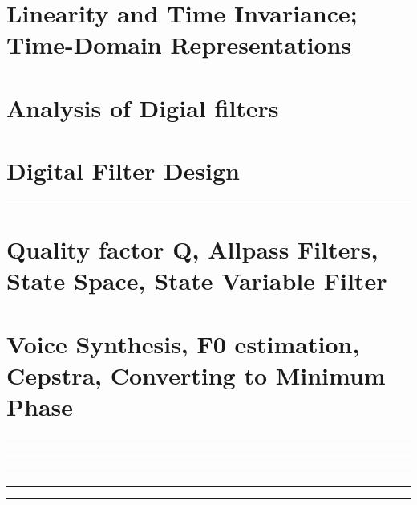 \documentclass[10pt]{article}
\begin{document}
\newcommand{\josquote}[1]{
    \framebox{
    \parbox{\textwidth}{
    \textit{#1}
    }
    }
}

\newcommand{\paulhint}[1]{
    #1
}

\setlength\parindent{0pt}
\section{Linearity and Time Invariance; Time-Domain Representations}
%
%
%
%
%
\section{Analysis of Digial filters}
%
%
%
%
%
\section{Digital Filter Design}
%
%
%
%
%
%

\noindent\rule[0.5ex]{\linewidth}{0.5pt}
\section{Quality factor Q, Allpass Filters, State Space, State Variable Filter}
%
%
%
%
%
%
%
\section{Voice Synthesis, F0 estimation, Cepstra, Converting to Minimum Phase}
\noindent\rule[0.5ex]{\linewidth}{0.5pt}

\noindent\rule[0.5ex]{\linewidth}{0.5pt}

\noindent\rule[0.5ex]{\linewidth}{0.5pt}

\noindent\rule[0.5ex]{\linewidth}{0.5pt}

\noindent\rule[0.5ex]{\linewidth}{0.5pt}

\noindent\rule[0.5ex]{\linewidth}{0.5pt}

\end{document}
